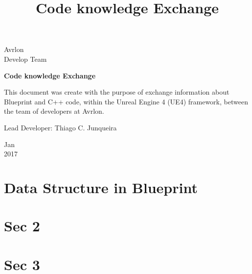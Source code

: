 \documentclass[a4paper, 12pt]{article}
\begin{document}
\begin{titlepage}
	\begin{center}
	

		\Huge{Avrlon}\\
		\large{Develop Team}\\ 
\vspace{15pt}
        
        \vspace{85pt}
        
		\textbf{\LARGE{Code knowledge Exchange}}
		\title{\large{Code knowledge Exchange}}
			
	\end{center}
\vspace{1,5cm}
	
	\begin{flushright}

   \begin{list}{}{
      \setlength{\leftmargin}{4.5cm}
      \setlength{\rightmargin}{0cm}
      \setlength{\labelwidth}{0pt}
      \setlength{\labelsep}{\leftmargin}}

      \item This document was create with the purpose of exchange information about Blueprint and C++ code, within the Unreal Engine 4 (UE4) framework, between the team of developers at Avrlon.    

      \begin{list}{}{
      \setlength{\leftmargin}{0cm}
      \setlength{\rightmargin}{0cm}
      \setlength{\labelwidth}{0pt}
      \setlength{\labelsep}{\leftmargin}}

			\item Lead Developer: Thiago C. Junqueira \

      \end{list}
   \end{list}
\end{flushright}
\vspace{1cm}
\begin{center}
		\vspace{\fill}
		 Jan \\
		 2017
			\end{center}
\end{titlepage}
\newpage
\newpage
\tableofcontents
\thispagestyle{empty}

\newpage
{}
\section{Data Structure in Blueprint}



\section {Sec 2}



\section{Sec 3}
\label{Sec3}
\end{document}
